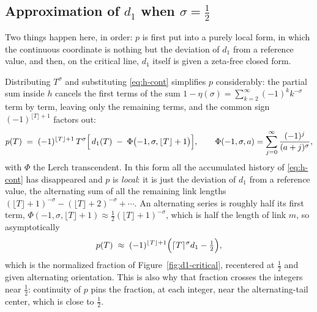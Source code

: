 \documentclass[11pt]{article}
\theoremstyle{definition}
\begin{document}
\subsection{Approximation of \texorpdfstring{$d_1$}{d1} when \texorpdfstring{$\sigma=\tfrac12$}{sigma=1/2}}\label{sec:d1-approx-critical}

Two things happen here, in order: $p$ is first put into a purely local form, in
which the continuous coordinate is nothing but the deviation of $d_1$ from a
reference value, and then, on the critical line, $d_1$ itself is given a
zeta-free closed form.

Distributing $T^{\sigma}$ and substituting \eqref{eq:h-cont} simplifies $p$
considerably: the partial sum inside $h$ cancels the first terms of the sum
$1-\eta(\sigma)=\sum_{k=2}^{\infty}(-1)^{k}k^{-\sigma}$ term by term, leaving
only the remaining terms, and the common sign $(-1)^{\lfloor T\rfloor+1}$ factors out:
\begin{equation}\label{eq:p-simplified}
p(T) \;=\; (-1)^{\lfloor T\rfloor+1}\, T^{\sigma}
\Bigl[\, d_1(T) \;-\; \Phi\bigl(-1,\sigma,\lfloor T\rfloor+1\bigr) \Bigr],
\qquad
\Phi(-1,\sigma,a) = \sum_{j=0}^{\infty} \frac{(-1)^{j}}{(a+j)^{\sigma}},
\end{equation}
with $\Phi$ the Lerch transcendent. In this form all the accumulated history
of \eqref{eq:h-cont} has disappeared and $p$ is \emph{local}: it is just the
deviation of $d_1$ from a reference value, the alternating sum of all the
remaining link lengths
$(\lfloor T\rfloor+1)^{-\sigma}-(\lfloor T\rfloor+2)^{-\sigma}+\cdots$.
An alternating series is roughly half its first term,
$\Phi(-1,\sigma,\lfloor T\rfloor+1)\approx\tfrac12(\lfloor T\rfloor+1)^{-\sigma}$,
which is half the length of link $m$, so asymptotically
\[
p(T) \;\approx\; (-1)^{\lfloor T\rfloor+1}
\Bigl( \lceil T\rceil^{\sigma} d_1 - \tfrac12 \Bigr),
\]
which is the normalized fraction of Figure~\ref{fig:d1-critical}, recentered
at $\tfrac12$ and given alternating orientation. This is also why that fraction
crosses the integers near $\tfrac12$: continuity of $p$ pins the fraction, at
each integer, near the alternating-tail center, which is close to $\tfrac12$.
\end{document}
